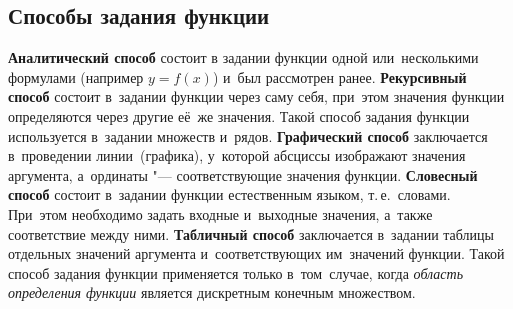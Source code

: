 \documentclass[]{scrartcl}
\begin{document}
\subsection{Способы задания функции}
\textbf{Аналитический способ} состоит в задании функции одной или~несколькими формулами (например ${\textstyle y=f(x)}$) и~был рассмотрен ранее.
\textbf{Рекурсивный способ} состоит в~задании функции через саму себя, при~этом значения функции определяются через другие её~же значения. Такой способ задания функции используется в~задании множеств и~рядов.
\textbf{Графический способ} заключается в~проведении линии~(графика), у~которой абсциссы изображают значения аргумента, а~ординаты "--- соответствующие значения функции.
\textbf{Словесный способ} состоит в~задании функции естественным языком, т.\,е.~словами. При~этом необходимо задать входные и~выходные значения, а~также соответствие между ними.
\textbf{Табличный способ} заключается в~задании таблицы отдельных значений аргумента и~соответствующих им~значений функции. Такой способ задания функции применяется только в~том~случае, когда \emph{область определения функции} является дискретным конечным множеством.
\end{document}
